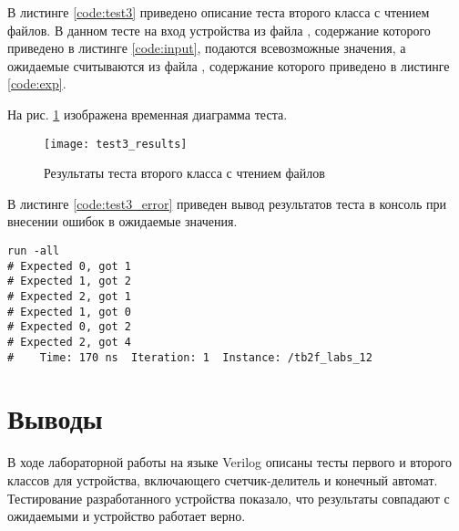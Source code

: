 В листинге \ref{code:test3} приведено описание теста второго класса с чтением файлов. В данном тесте на вход устройства из файла , содержание которого приведено в листинге \ref{code:input}, подаются всевозможные значения, а ожидаемые считываются из файла , содержание которого приведено в листинге \ref{code:exp}.

\newpage


\begin{multicols}{2}
		
	
\end{multicols}

\newpage

На рис. \ref{fig:test3_results} изображена временная диаграмма теста.
\begin{figure}[H]
	\begin{center}
		\texttt{[image: test3\_results]}
		\caption{Результаты теста второго класса с чтением файлов}
		\label{fig:test3_results}
	\end{center}
\end{figure}

В листинге \ref{code:test3_error} приведен вывод результатов теста в консоль при внесении ошибок в ожидаемые значения.
\begin{lstlisting}[caption=Результаты ошибочного теста второго класса с чтением файлов, label=code:test3_error, style=console]
run -all
# Expected 0, got 1
# Expected 1, got 2
# Expected 2, got 1
# Expected 1, got 0
# Expected 0, got 2
# Expected 2, got 4
#    Time: 170 ns  Iteration: 1  Instance: /tb2f_labs_12
\end{lstlisting}

\section{Выводы}

В ходе лабораторной работы на языке Verilog описаны тесты первого и второго классов для устройства, включающего счетчик-делитель и конечный автомат. Тестирование разработанного устройства показало, что результаты совпадают с ожидаемыми и устройство работает верно.

